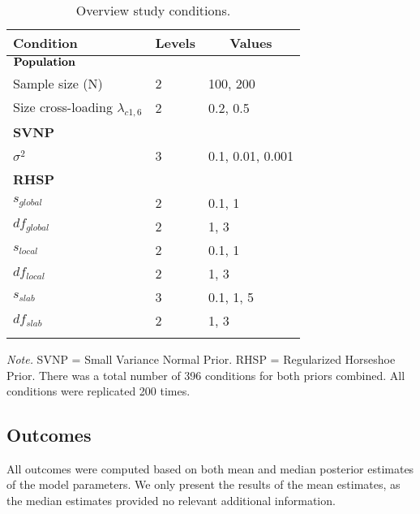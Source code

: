 \documentclass[
  man, donotrepeattitle,floatsintext]{apa6}
\begin{document}
\begin{table}[tbp]

\begin{center}
\begin{threeparttable}

\caption{\label{tab:unnamed-chunk-2}Overview study conditions.}

\begin{tabular}{lll}
\toprule
Condition & \multicolumn{1}{c}{Levels} & \multicolumn{1}{c}{Values}\\
\midrule
$\bf{Population}$ &  & \\
Sample size (N) & 2 & 100, 200\\
Size cross-loading $\lambda_{c1 , 6}$ & 2 & 0.2, 0.5\\
\bf{SVNP} &  & \\
$\sigma^2$ & 3 & 0.1, 0.01, 0.001\\
\bf{RHSP} &  & \\
$s_{global}$ & 2 & 0.1, 1\\
$df_{global}$ & 2 & 1, 3\\
$s_{local}$ & 2 & 0.1, 1\\
$df_{local}$ & 2 & 1, 3\\
$s_{slab}$ & 3 & 0.1, 1, 5\\
$df_{slab}$ & 2 & 1, 3\\
\bottomrule
\addlinespace
\end{tabular}

\begin{tablenotes}[para]
\normalsize{\textit{Note.} SVNP = Small Variance Normal Prior. RHSP = Regularized Horseshoe Prior. There was a total number of 396 conditions for both priors combined.  All conditions were replicated 200 times.}
\end{tablenotes}

\end{threeparttable}
\end{center}

\end{table}

\hypertarget{outcomes}{%
\subsection{Outcomes}\label{outcomes}}

All outcomes were computed based on both mean and median posterior estimates of the model parameters. We only present the results of the mean estimates, as the median estimates provided no relevant additional information.
\end{document}
